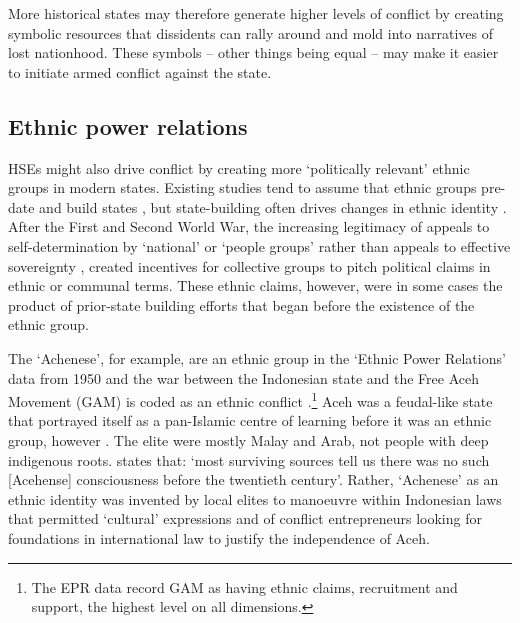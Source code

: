 

More historical states may therefore generate higher levels of conflict by
creating symbolic resources that dissidents can rally around and mold into
narratives of lost nationhood. These symbols -- other things being equal -- may
make it easier to initiate armed conflict against the state.  


\subsection{Ethnic power relations}

HSEs might also drive conflict by creating more `politically relevant' ethnic
groups in modern states. Existing studies tend to assume that ethnic groups
pre-date and build states \citep{Paine2019, Wig2016}, but state-building often
drives changes in ethnic identity \citep{Anderson2006, Chandra2006, Wimmer2018}.
After the First and Second World War, the increasing legitimacy of appeals to
self-determination by `national' or `people groups' rather than appeals to
effective sovereignty \citep{Clapham1996, Jackson1991}, created incentives for
collective groups to pitch political claims in ethnic or communal terms. These
ethnic claims, however, were in some cases the product of prior-state building
efforts that began before the existence of the ethnic group. 

The `Achenese', for example, are an ethnic group in the `Ethnic Power Relations'
data from 1950 \citep{Vogt2015} and the war between the Indonesian state and the
Free Aceh Movement (GAM) is coded as an ethnic conflict
\citep{Vogt2015}.\footnote{The EPR data record GAM as having ethnic claims,
recruitment and support, the highest level on all dimensions.} Aceh was a
feudal-like state that portrayed itself as a pan-Islamic centre of learning
before it was an ethnic group, however \citep[20]{Aspinall2009}. The elite were
mostly Malay and Arab, not people with deep indigenous roots.
\citet[46-47]{Aspinall2009} states that: `most surviving sources tell us there
was no such [Acehense] consciousness before the twentieth century'. Rather,
`Achenese' as an ethnic identity was invented by local elites to manoeuvre
within Indonesian laws that permitted `cultural' expressions and of conflict
entrepreneurs looking for foundations in international law to justify the
independence of Aceh. 

